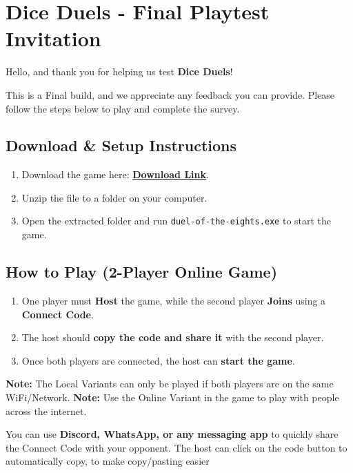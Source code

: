 \documentclass{article}
\begin{document}
\newpage

\section{Dice Duels - Final Playtest Invitation}

Hello, and thank you for helping us test \textbf{Dice Duels}!

This is a Final build, and we appreciate any feedback you can provide. Please follow the steps below to play and complete the survey.

\subsection{Download \& Setup Instructions}
\begin{enumerate}
    \item Download the game here: \href{https://drive.google.com/file/d/1d3nVYBTYOlCqEDQzMCE7T-mupDVaDM37/view?usp=sharing}{\textbf{Download Link}}.
    \item Unzip the file to a folder on your computer.
    \item Open the extracted folder and run \texttt{duel-of-the-eights.exe} to start the game.
\end{enumerate}

\subsection{How to Play (2-Player Online Game)}
\begin{enumerate}
    \item One player must \textbf{Host} the game, while the second player \textbf{Joins} using a \textbf{Connect Code}.
    \item The host should \textbf{copy the code and share it} with the second player.
    \item Once both players are connected, the host can \textbf{start the game}.
\end{enumerate}

\textbf{Note:} The Local Variants can only be played if both players are on the same WiFi/Network.
\textbf{Note:} Use the Online Variant in the game to play with people across the internet.

\begin{tcolorbox}[colback=gray!10, colframe=black, title=Tip]
You can use \textbf{Discord, WhatsApp, or any messaging app} to quickly share the Connect Code with your opponent.
The host can click on the code button to automatically copy, to make copy/pasting easier
\end{tcolorbox}
\end{document}
